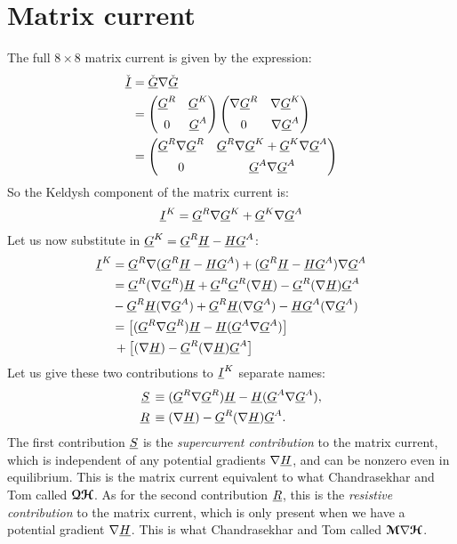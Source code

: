 \section{Matrix current}
The full $8\times8$ matrix current is given by the expression:
\begin{align}
  \check{\underline{I}} 
  &= 
  \check{\underline{G}} \nabla \check{\underline{G}}
  \\ &= 
  \begin{pmatrix} 
    \underline{G}^R  & \underline{G}^K \\[1ex] 0 & \underline{G}^A
  \end{pmatrix}
  \begin{pmatrix} 
    \nabla\underline{G}^R  & \nabla\underline{G}^K \\[1ex] 0 & \nabla\underline{G}^A
  \end{pmatrix}
  \\ &= 
  \begin{pmatrix} 
    \underline{G}^R\nabla\underline{G}^R  & \underline{G}^R\nabla\underline{G}^K + \underline{G}^K\nabla\underline{G}^A \\[1ex] 0 & \underline{G}^A\nabla\underline{G}^A
  \end{pmatrix}
\end{align}
So the Keldysh component of the matrix current is:
\begin{align}
  \underline{I}^K = \underline{G}^R\nabla\underline{G}^K + \underline{G}^K\nabla\underline{G}^A
\end{align}
Let us now substitute in $\underline{G}^K = \underline{G}^R \underline{H} - \underline{H} \underline{G}^A$:
\begin{align*}
  \underline{I}^K 
  &= 
  \underline{G}^R\nabla(\underline{G}^R \underline{H} - \underline{H} \underline{G}^A)+ (\underline{G}^R \underline{H} - \underline{H} \underline{G}^A) \nabla\underline{G}^A 
  \\ &=
  \underline{G}^R(\nabla\underline{G}^R) \underline{H} + \underline{G}^R\underline{G}^R (\nabla\underline{H}) - \underline{G}^R (\nabla\underline{H}) \underline{G}^A 
  \\ &
  - \underline{G}^R \underline{H} (\nabla\underline{G}^A) + \underline{G}^R \underline{H}(\nabla\underline{G}^A) - \underline{H} \underline{G}^A (\nabla\underline{G}^A)
  \\ &=
  \big[ (\underline{G}^R \nabla \underline{G}^R) \underline{H} - \underline{H} (\underline{G}^A \nabla \underline{G}^A) \big]
  \\ &\,+
  \big[ (\nabla\underline{H}) - \underline{G}^R (\nabla\underline{H}) \underline{G}^A \big]
\end{align*}
Let us give these two contributions to $\underline{I}^K$ separate names:
\begin{align}
  \underline{S}\, &\equiv (\underline{G}^R \nabla \underline{G}^R) \underline{H} - \underline{H} (\underline{G}^A \nabla \underline{G}^A),  \\
  \underline{R}\, &\equiv (\nabla\underline{H}) - \underline{G}^R (\nabla\underline{H}) \underline{G}^A.
\end{align}
The first contribution $\underline{S}$ is the \emph{supercurrent contribution} to the matrix current, which is independent of any potential gradients $\nabla\underline{H}$, and can be nonzero even in equilibrium.
This is the matrix current equivalent to what Chandrasekhar and Tom called $\bm{\mathcal{Q}}\bm{\mathcal{H}}$.
As for the second contribution $\underline{R}$, this is the \emph{resistive contribution} to the matrix current, which is only present when we have a potential gradient $\nabla\underline{H}$.
This is what Chandrasekhar and Tom called $\bm{\mathcal{M}}\nabla\bm{\mathcal{H}}$.

